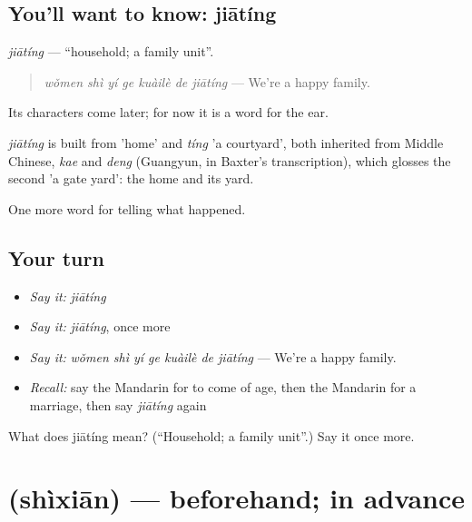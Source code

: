 \subsection*{You'll want to know: jiātíng}
\emph{jiātíng} — \textquotedblleft{}household; a family unit\textquotedblright{}.

\begin{quote}
\emph{wǒmen shì yí ge kuàilè de jiātíng} — We're a happy family.
\end{quote}

Its characters come later; for now it is a word for the ear.

\begin{cousinweb}
\emph{jiātíng} is built from  'home' and \emph{tíng} 'a courtyard', both inherited from Middle Chinese, \emph{kae} and \emph{deng} (Guangyun, in Baxter's transcription), which glosses the second 'a gate yard': the home and its yard.
\end{cousinweb}

\begin{grammarlens}[title={What you've built}]
One more word for telling what happened.
\end{grammarlens}

\subsection*{Your turn}
\begin{itemize}
\raggedright
  \item \emph{Say it:} \emph{jiātíng}
  \item \emph{Say it:} \emph{jiātíng}, once more
  \item \emph{Say it:} \emph{wǒmen shì yí ge kuàilè de jiātíng} — We're a happy family.
  \item \emph{Recall:} say the Mandarin for to come of age, then the Mandarin for a marriage, then say \emph{jiātíng} again
\end{itemize}

\begin{tcolorbox}[breakable,colback=teal!4,colframe=teal!35!black,title={Before you move on}]
What does jiātíng mean? (\textquotedblleft{}Household; a family unit\textquotedblright{}.) Say it once more.
\end{tcolorbox}
\section[\texorpdfstring{\zh{事先} (shìxiān)}{事先 (shìxiān)}]{ (shìxiān) — beforehand; in advance}

